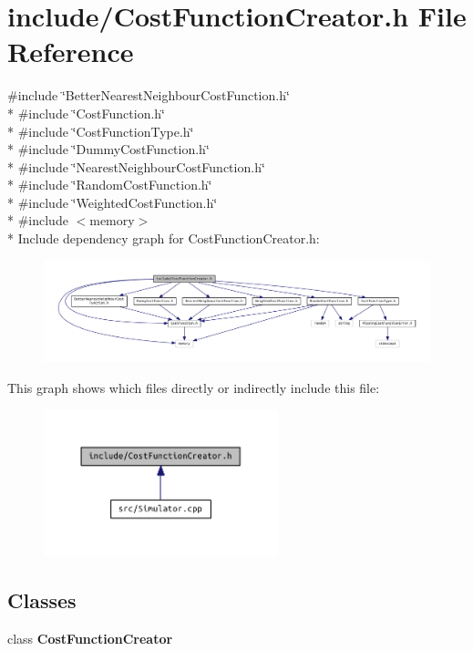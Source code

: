 \section{include/\+Cost\+Function\+Creator.h File Reference}
\label{_cost_function_creator_8h}
{\ttfamily \#include \char`\"{}Better\+Nearest\+Neighbour\+Cost\+Function.\+h\char`\"{}}\\*
{\ttfamily \#include \char`\"{}Cost\+Function.\+h\char`\"{}}\\*
{\ttfamily \#include \char`\"{}Cost\+Function\+Type.\+h\char`\"{}}\\*
{\ttfamily \#include \char`\"{}Dummy\+Cost\+Function.\+h\char`\"{}}\\*
{\ttfamily \#include \char`\"{}Nearest\+Neighbour\+Cost\+Function.\+h\char`\"{}}\\*
{\ttfamily \#include \char`\"{}Random\+Cost\+Function.\+h\char`\"{}}\\*
{\ttfamily \#include \char`\"{}Weighted\+Cost\+Function.\+h\char`\"{}}\\*
{\ttfamily \#include $<$memory$>$}\\*
Include dependency graph for Cost\+Function\+Creator.\+h\+:
\nopagebreak
\begin{figure}[H]
\begin{center}
\leavevmode
\includegraphics[width=350pt]{_cost_function_creator_8h__incl}
\end{center}
\end{figure}
This graph shows which files directly or indirectly include this file\+:
\nopagebreak
\begin{figure}[H]
\begin{center}
\leavevmode
\includegraphics[width=193pt]{_cost_function_creator_8h__dep__incl}
\end{center}
\end{figure}
\subsection*{Classes}
\begin{DoxyCompactItemize}
\item 
class {\bf Cost\+Function\+Creator}
\end{DoxyCompactItemize}
